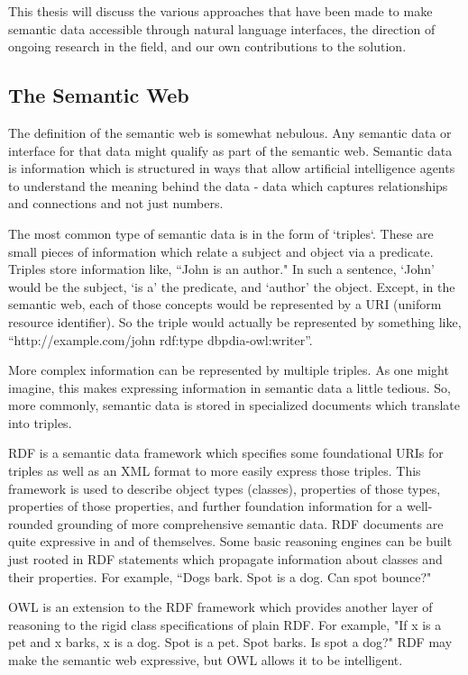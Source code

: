 \documentclass[11pt]{article}
\begin{document}
This thesis will discuss the various approaches that have been made to make
semantic data accessible through natural language interfaces, the direction of ongoing
research in the field, and our own contributions to the solution.

\subsection{The Semantic Web}

The definition of the semantic web is somewhat nebulous. Any semantic
data or interface for that data might qualify as part of the semantic web.
Semantic data is information which is structured in ways that allow artificial
intelligence agents to understand the meaning behind the data - data which
captures relationships and connections and not just numbers. 

The most common type of semantic data is in the form of `triples`. These are
small pieces of information which relate a subject and object via a predicate.
Triples store information like, ``John is an author." In such a sentence,
`John' would be the subject, `is a' the predicate, and `author' the object.
Except, in the semantic web, each of those concepts would be represented
by a URI (uniform resource identifier). So the triple would actually be
represented by something like, ``http://example.com/john rdf:type dbpdia-owl:writer''.

More complex information can be represented by multiple triples. As one might
imagine, this makes expressing information in semantic data a little tedious.
So, more commonly, semantic data is stored in specialized documents which 
translate into triples.

RDF\cite{rdf} is a semantic data framework which specifies some foundational URIs for triples
as well as an XML format to more easily express those triples. This framework
is used to describe object types (classes), properties of those types, properties
of those properties, and further foundation information for a well-rounded
grounding of more comprehensive semantic data. 
RDF documents are quite expressive in and of themselves.
Some basic reasoning engines can be built just rooted in RDF statements 
which propagate information about classes and their properties. For example, 
``Dogs bark. Spot is a dog. Can spot bounce?"

OWL\cite{owl} is an extension to the RDF framework which provides another layer
of reasoning to the rigid class specifications of plain RDF. For example,
"If x is a pet and x barks, x is a dog. Spot is a pet. Spot barks. Is spot a dog?"
RDF may make the semantic web expressive, but OWL allows it to be intelligent.
\end{document}
